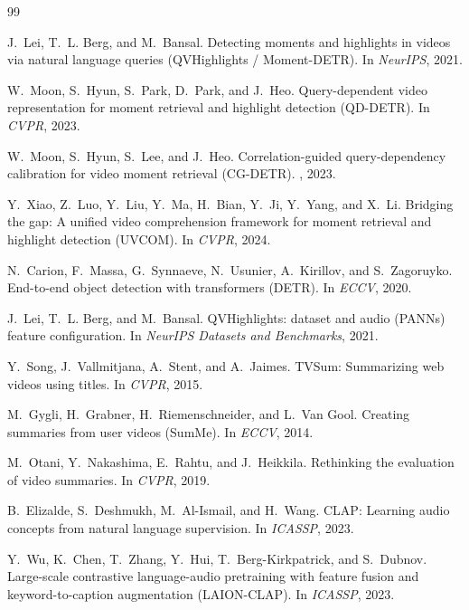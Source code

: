 \documentclass[10pt,twocolumn,letterpaper]{article}
\begin{document}
{\small

\begin{thebibliography}{99}

J.~Lei, T.~L. Berg, and M.~Bansal.
\newblock Detecting moments and highlights in videos via natural language queries (QVHighlights / Moment-DETR).
\newblock In {\em NeurIPS}, 2021.

W.~Moon, S.~Hyun, S.~Park, D.~Park, and J.~Heo.
\newblock Query-dependent video representation for moment retrieval and highlight detection (QD-DETR).
\newblock In {\em CVPR}, 2023.

W.~Moon, S.~Hyun, S.~Lee, and J.~Heo.
\newblock Correlation-guided query-dependency calibration for video moment retrieval (CG-DETR).
, 2023.

Y.~Xiao, Z.~Luo, Y.~Liu, Y.~Ma, H.~Bian, Y.~Ji, Y.~Yang, and X.~Li.
\newblock Bridging the gap: A unified video comprehension framework for moment retrieval and highlight detection (UVCOM).
\newblock In {\em CVPR}, 2024.

N.~Carion, F.~Massa, G.~Synnaeve, N.~Usunier, A.~Kirillov, and S.~Zagoruyko.
\newblock End-to-end object detection with transformers (DETR).
\newblock In {\em ECCV}, 2020.

J.~Lei, T.~L. Berg, and M.~Bansal.
\newblock QVHighlights: dataset and audio (PANNs) feature configuration.
\newblock In {\em NeurIPS Datasets and Benchmarks}, 2021.

Y.~Song, J.~Vallmitjana, A.~Stent, and A.~Jaimes.
\newblock TVSum: Summarizing web videos using titles.
\newblock In {\em CVPR}, 2015.

M.~Gygli, H.~Grabner, H.~Riemenschneider, and L.~Van Gool.
\newblock Creating summaries from user videos (SumMe).
\newblock In {\em ECCV}, 2014.

M.~Otani, Y.~Nakashima, E.~Rahtu, and J.~Heikkila.
\newblock Rethinking the evaluation of video summaries.
\newblock In {\em CVPR}, 2019.

B.~Elizalde, S.~Deshmukh, M.~Al-Ismail, and H.~Wang.
\newblock CLAP: Learning audio concepts from natural language supervision.
\newblock In {\em ICASSP}, 2023.

Y.~Wu, K.~Chen, T.~Zhang, Y.~Hui, T.~Berg-Kirkpatrick, and S.~Dubnov.
\newblock Large-scale contrastive language-audio pretraining with feature fusion and keyword-to-caption augmentation (LAION-CLAP).
\newblock In {\em ICASSP}, 2023.


\end{thebibliography}}
\end{document}
